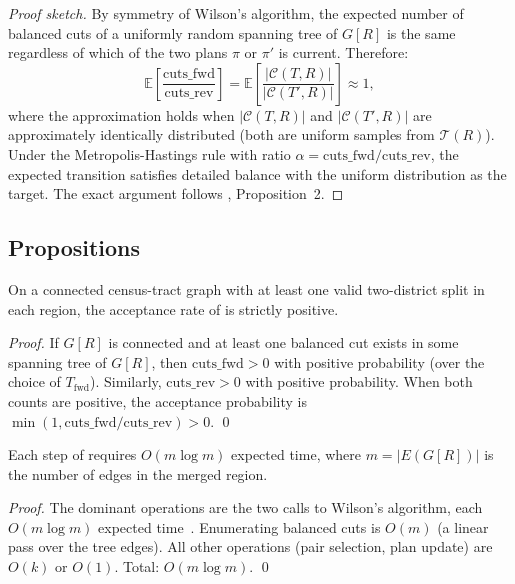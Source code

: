 \begin{proof}[Proof sketch]
By symmetry of Wilson's algorithm, the expected number of balanced cuts
of a uniformly random spanning tree of $G[R]$ is the same regardless of
which of the two plans $\pi$ or $\pi'$ is current.
Therefore:
\[
  \mathbb{E}\!\left[\frac{\mathrm{cuts\_fwd}}{\mathrm{cuts\_rev}}\right]
  = \mathbb{E}\!\left[\frac{|\mathcal{C}(T, R)|}{|\mathcal{C}(T', R)|}\right]
  \approx 1,
\]
where the approximation holds when $|\mathcal{C}(T, R)|$ and
$|\mathcal{C}(T', R)|$ are approximately identically distributed
(both are uniform samples from $\mathcal{T}(R)$).
Under the Metropolis-Hastings rule with ratio $\alpha = \mathrm{cuts\_fwd}/\mathrm{cuts\_rev}$,
the expected transition satisfies detailed balance with the uniform
distribution as the target.
The exact argument follows \citet{janson2022}, Proposition~2.
\end{proof}

\subsection{Propositions}

\begin{proposition}
\label{prop:positive-accept}
On a connected census-tract graph with at least one valid two-district
split in each region, the acceptance rate of \mergesplit{} is strictly
positive.
\end{proposition}

\begin{proof}
If $G[R]$ is connected and at least one balanced cut exists in some
spanning tree of $G[R]$, then $\mathrm{cuts\_fwd} > 0$ with positive
probability (over the choice of $T_{\mathrm{fwd}}$).
Similarly, $\mathrm{cuts\_rev} > 0$ with positive probability.
When both counts are positive, the acceptance probability is
$\min(1, \mathrm{cuts\_fwd}/\mathrm{cuts\_rev}) > 0$. \qed
\end{proof}

\begin{proposition}
\label{prop:cost}
Each step of \mergesplit{} requires $O(m \log m)$ expected time, where
$m = |E(G[R])|$ is the number of edges in the merged region.
\end{proposition}

\begin{proof}
The dominant operations are the two calls to Wilson's algorithm, each
$O(m \log m)$ expected time~\citep{wilson1996}.
Enumerating balanced cuts is $O(m)$ (a linear pass over the tree edges).
All other operations (pair selection, plan update) are $O(k)$ or $O(1)$.
Total: $O(m \log m)$. \qed
\end{proof}
